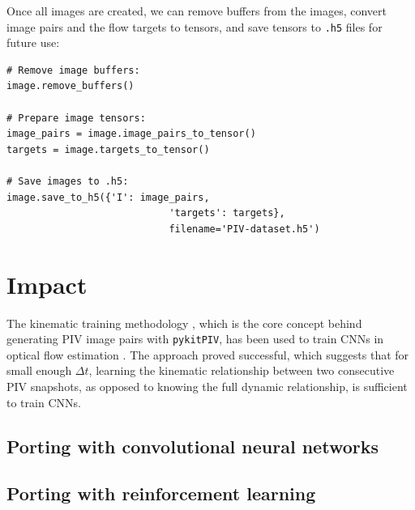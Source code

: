 \documentclass[a4paper,fleqn]{cas-dc}
\newcommand{ \kamila}[1]{\color{blue}{Kamila: #1} \color{black}}
\begin{document}
Once all images are created, we can remove buffers from the images, convert image pairs and the flow targets to tensors, and save tensors to \texttt{.h5} files for future use:
\lstset{language=Python}
\begin{lstlisting}
# Remove image buffers:
image.remove_buffers()

# Prepare image tensors:
image_pairs = image.image_pairs_to_tensor()
targets = image.targets_to_tensor()

# Save images to .h5:
image.save_to_h5({'I': image_pairs, 
							'targets': targets}, 
							filename='PIV-dataset.h5')
\end{lstlisting}

\section{Impact} \label{sec:results}

The kinematic training methodology \cite{manickathan2022kinematic}, which is the core concept behind generating PIV image pairs with \texttt{pykitPIV}, has been used to train CNNs in optical flow estimation \cite{manickathan2022kinematic, manickathan2023lightweight, mucignat2023lightweight}. The approach proved successful, which suggests that for small enough $\Delta t$, learning the kinematic relationship between two consecutive PIV snapshots, as opposed to knowing the full dynamic relationship, is sufficient to train CNNs.




\kamila{It would be great if we could extend image generation to synthetic event-based camera datasets. This would make the software truly novel.}

\kamila{Perhaps a nice novelty would be to allow the user to add solid boundaries into the image?}


\subsection{Porting with convolutional neural networks}

\kamila{Here we can describe what can be achieved in terms of training a CNN.}

\subsection{Porting with reinforcement learning}

\kamila{Here we can describe what can be achieved in terms of training an RL agent, e.g. in the context of autonomous experimentation. Maybe the agent will learn to augment the dataset in real time to account for changing experimental settings.}
\end{document}
